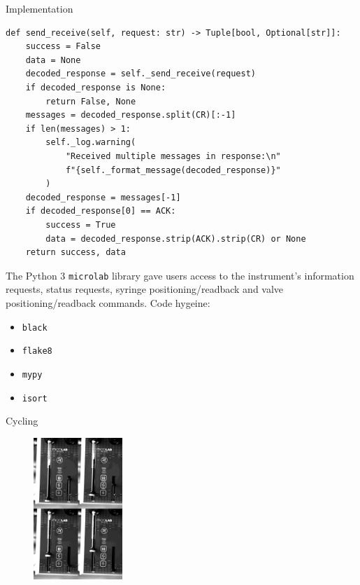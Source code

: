 \documentclass[a0paper,landscape,fontscale=0.32]{baposter}
\begin{document}
\begin{poster}
\begin{posterbox}[name=implementation,column=1,span=2]{Implementation}
\begin{verbatim}
def send_receive(self, request: str) -> Tuple[bool, Optional[str]]:
    success = False
    data = None
    decoded_response = self._send_receive(request)
    if decoded_response is None:
        return False, None
    messages = decoded_response.split(CR)[:-1]
    if len(messages) > 1:
        self._log.warning(
            "Received multiple messages in response:\n"
            f"{self._format_message(decoded_response)}"
        )
    decoded_response = messages[-1]
    if decoded_response[0] == ACK:
        success = True
        data = decoded_response.strip(ACK).strip(CR) or None
    return success, data
\end{verbatim}
The Python 3 \texttt{microlab} library gave users access to the instrument's information requests, status requests, syringe positioning/readback and valve positioning/readback commands.
Code hygeine:
\begin{multicols}{2}
 \begin{itemize}
     \item \texttt{black} 
     \item \texttt{flake8} 
     \item \texttt{mypy} 
     \item \texttt{isort} 
\end{itemize}
\end{multicols}
\end{posterbox}
\begin{posterbox}[name=cycling,column=1,span=2,below=implementation]{Cycling}
\begin{multicols}{2}
\begin{figure}[H]
    \begin{center}
    \includegraphics[width=0.3\textwidth]{images/combined}

\end{center}
\end{figure}
\end{multicols}
\end{posterbox}
\end{poster}
\end{document}
